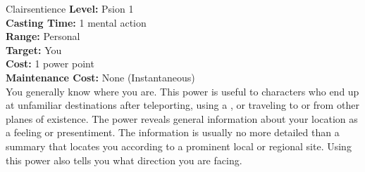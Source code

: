 {Clairsentience}
{
	\textbf{Level:}
	Psion 1\\
	\textbf{Casting Time:}
	1 mental action\\
	\textbf{Range:}
	Personal\\
	\textbf{Target:}
	You\\
	\textbf{Cost:}
	1 power point\\
	\textbf{Maintenance Cost:}
	None (Instantaneous)\\
}
{
	You generally know where you are. This power is useful to characters who end up at unfamiliar destinations after teleporting, using a , or traveling to or from other planes of existence. The power reveals general information about your location as a feeling or presentiment. The information is usually no more detailed than a summary that locates you according to a prominent local or regional site. Using this power also tells you what direction you are facing.
}